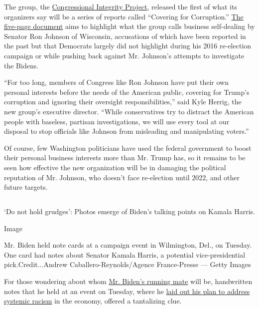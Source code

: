 The group, the \href{https://congressionalintegrity.org/}{Congressional
Integrity Project}, released the first of what its organizers say will
be a series of reports called ``Covering for Corruption.''
\href{https://congressionalintegrity.org/wp-content/uploads/2020/07/CIP_Report_FINAL_07272020.pdf}{The
five-page document} aims to highlight what the group calls business
self-dealing by Senator Ron Johnson of Wisconsin, accusations of which
have been reported in the past but that Democrats largely did not
highlight during his 2016 re-election campaign or while pushing back
against Mr. Johnson's attempts to investigate the Bidens.

``For too long, members of Congress like Ron Johnson have put their own
personal interests before the needs of the American public, covering for
Trump's corruption and ignoring their oversight responsibilities,'' said
Kyle Herrig, the new group's executive director. ``While conservatives
try to distract the American people with baseless, partisan
investigations, we will use every tool at our disposal to stop officials
like Johnson from misleading and manipulating voters.''

Of course, few Washington politicians have used the federal government
to boost their personal business interests more than Mr. Trump has, so
it remains to be seen how effective the new organization will be in
damaging the political reputation of Mr. Johnson, who doesn't face
re-election until 2022, and other future targets.

\hypertarget{-8}{%
\subsection{}\label{-8}}

`Do not hold grudges': Photos emerge of Biden's talking points on Kamala
Harris.

Image

Mr. Biden held note cards at a campaign event in Wilmington, Del., on
Tuesday. One card had notes about Senator Kamala Harris, a potential
vice-presidential pick.Credit...Andrew Caballero-Reynolds/Agence
France-Presse --- Getty Images

For those wondering about whom
\href{https://www.nytimes.com/article/biden-vice-president-2020.html}{Mr.
Biden's running mate} will be, handwritten notes that he held at an
event on Tuesday, where he
\href{https://www.nytimes.com/2020/07/28/us/politics/joe-biden-racial-justice-economy-plan.html}{laid
out his plan to address systemic racism} in the economy, offered a
tantalizing clue.

